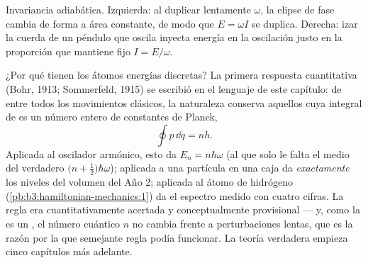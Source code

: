 \begin{omfigure}

{\small Invariancia adiabática. Izquierda: al duplicar lentamente $\omega$,
la elipse de fase cambia de forma a área constante, de modo que
$E = \omega I$ se duplica. Derecha: izar la cuerda de un péndulo que oscila
inyecta energía en la oscilación justo en la proporción que mantiene fijo
$I = E/\omega$.}
\end{omfigure}

\begin{remark}\label{rem:b3:hamiltonian-mechanics:old-quantum}
¿Por qué tienen los átomos energías discretas? La primera respuesta
cuantitativa (Bohr, 1913; Sommerfeld, 1915) se escribió en el lenguaje de
este capítulo: de entre todos los movimientos clásicos, la naturaleza
conserva aquellos cuya integral de  es un número entero de constantes
de Planck,
\[
\oint p\,\dd q = nh .
\]
Aplicada al oscilador armónico, esto da $E_n = n\hbar\omega$
(al que solo le falta el medio del verdadero $\big(n + \tfrac12\big)\hbar
\omega$); aplicada a una partícula en una caja da \emph{exactamente} los
niveles del volumen del Año 2; aplicada al átomo de hidrógeno
(\cref{pb:b3:hamiltonian-mechanics:1}) da el espectro medido con cuatro
cifras. La regla era cuantitativamente acertada y conceptualmente
provisional --- y, como la  es un , el número
cuántico $n$ no cambia frente a perturbaciones lentas, que es la razón por
la que semejante regla podía funcionar. La teoría verdadera empieza cinco
capítulos más adelante.
\end{remark}


